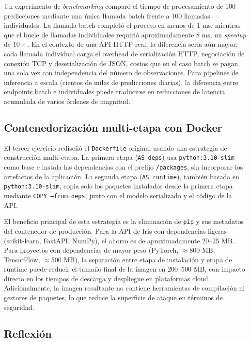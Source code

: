 \documentclass[12pt, a4paper]{article}
\begin{document}
Un experimento de \textit{benchmarking} comparó el tiempo de procesamiento de 100 predicciones mediante una única llamada batch frente a 100 llamadas individuales. La llamada batch completó el proceso en menos de 1 ms, mientras que el bucle de llamadas individuales requirió aproximadamente 8 ms, un \textit{speedup} de $10\times$. En el contexto de una API HTTP real, la diferencia sería aún mayor: cada llamada individual carga el overhead de serialización HTTP, negociación de conexión TCP y deserialización de JSON, costos que en el caso batch se pagan una sola vez con independencia del número de observaciones. Para pipelines de inferencia a escala (cientos de miles de predicciones diarias), la diferencia entre endpoints batch e individuales puede traducirse en reducciones de latencia acumulada de varios órdenes de magnitud.

\subsection{Contenedorización multi-etapa con Docker}

El tercer ejercicio rediseñó el \texttt{Dockerfile} original usando una estrategia de construcción multi-etapa. La primera etapa (\texttt{AS deps}) usa \texttt{python:3.10-slim} como base e instala las dependencias con el prefijo \texttt{/packages}, sin incorporar los artefactos de la aplicación. La segunda etapa (\texttt{AS runtime}), también basada en \texttt{python:3.10-slim}, copia solo los paquetes instalados desde la primera etapa mediante \texttt{COPY --from=deps}, junto con el modelo serializado y el código de la API.

El beneficio principal de esta estrategia es la eliminación de \texttt{pip} y sus metadatos del contenedor de producción. Para la API de Iris con dependencias ligeras (scikit-learn, FastAPI, NumPy), el ahorro es de aproximadamente 20--25 MB. Para proyectos con dependencias de mayor peso (PyTorch, $\approx$800 MB; TensorFlow, $\approx$500 MB), la separación entre etapa de instalación y etapa de runtime puede reducir el tamaño final de la imagen en 200--500 MB, con impacto directo en los tiempos de descarga y despliegue en plataformas cloud. Adicionalmente, la imagen resultante no contiene herramientas de compilación ni gestores de paquetes, lo que reduce la superficie de ataque en términos de seguridad.

\subsection{Reflexión}
\end{document}
